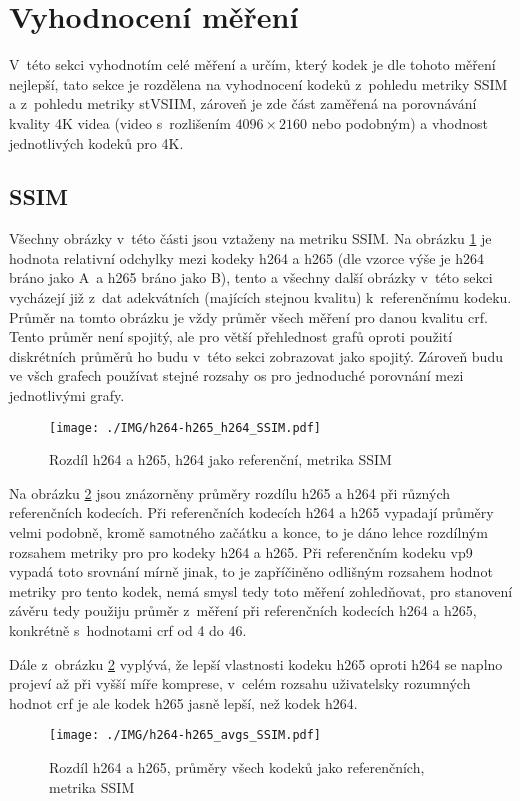 \documentclass[thesis=M,czech]{FITthesis}[2016/06/26]
\begin{document}
\section{Vyhodnocení měření}
V~této sekci vyhodnotím celé měření a určím, který kodek je dle tohoto měření nejlepší, tato sekce je rozdělena na vyhodnocení kodeků z~pohledu metriky SSIM a z~pohledu metriky stVSIIM, zároveň je zde část zaměřená na porovnávání kvality 4K videa (video s~rozlišením $4096 \times 2160$ nebo podobným) a vhodnost jednotlivých kodeků pro 4K.
\subsection{SSIM}
Všechny obrázky v~této části jsou vztaženy na metriku SSIM.
Na obrázku \ref{fig:h264-h265_h264_SSIM} je hodnota relativní odchylky mezi kodeky h264 a h265 (dle vzorce výše je h264 bráno jako A~a h265 bráno jako B), tento a všechny další obrázky v~této sekci vycházejí již z~dat adekvátních (majících stejnou kvalitu) k~referenčnímu kodeku. Průměr na tomto obrázku je vždy průměr všech měření pro danou kvalitu crf. Tento průměr není spojitý, ale pro větší přehlednost grafů oproti použití diskrétních průměrů ho budu v~této sekci zobrazovat jako spojitý.	Zároveň budu ve všch grafech používat stejné rozsahy os pro jednoduché porovnání mezi jednotlivými grafy.
\begin{figure}[htb]\centering
\texttt{[image: ./IMG/h264-h265\_h264\_SSIM.pdf]}
\caption{Rozdíl h264 a h265, h264 jako referenční, metrika SSIM}
\label{fig:h264-h265_h264_SSIM}
\end{figure}
Na obrázku \ref{fig:h264-h265_avgs_SSIM} jsou znázorněny průměry rozdílu h265 a h264 při různých referenčních kodecích. Při referenčních kodecích h264 a h265 vypadají průměry velmi podobně, kromě samotného začátku a konce, to je dáno lehce rozdílným rozsahem metriky pro pro kodeky h264 a h265. Při referenčním kodeku vp9 vypadá toto srovnání mírně jinak, to je zapříčiněno odlišným rozsahem hodnot metriky pro tento kodek, nemá smysl tedy  toto měření zohledňovat, pro stanovení závěru tedy použiju průměr z~měření při referenčních kodecích h264 a h265, konkrétně s~hodnotami crf od 4 do 46.

Dále z~obrázku \ref{fig:h264-h265_avgs_SSIM} vyplývá, že lepší vlastnosti kodeku h265 oproti h264 se naplno projeví až při vyšší míře komprese, v~celém rozsahu uživatelsky rozumných hodnot crf je ale kodek h265 jasně lepší, než kodek h264. 
\begin{figure}[]\centering
\texttt{[image: ./IMG/h264-h265\_avgs\_SSIM.pdf]}
\caption{Rozdíl h264 a h265, průměry všech kodeků jako referenčních, metrika SSIM}
\label{fig:h264-h265_avgs_SSIM}
\end{figure}
\end{document}
